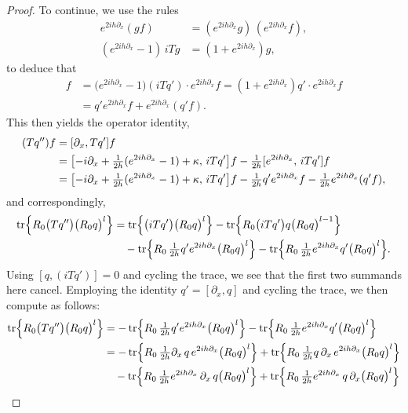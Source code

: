 \documentclass{amsart}
\DeclareMathOperator{\tr}{tr}
\theoremstyle{definition}
\theoremstyle{remark}
\begin{document}
\begin{proof}
To continue, we use the rules
\begin{align}\label{chain rule}
e^{2ih\partial_x}(gf) &= (e^{2ih\partial_x}g)\,(e^{2ih\partial_x}f), \\
(e^{2ih\partial_x} - 1) \,iT g &= (1+e^{2ih\partial_x})g,
\end{align}
to deduce that 
\begin{align*}
 [ e^{2ih\partial_x} , \,iTq']f &= \bigl(e^{2ih\partial_x}-1\bigr) (iTq') \cdot e^{2ih\partial_x} f
 	= (1+e^{2ih\partial_x})q' \cdot e^{2ih\partial_x} f \\
&= q' e^{2ih\partial_x} f + e^{2ih\partial_x}(q'f).
\end{align*}
This then yields the operator identity,
\begin{align}\label{444}
(Tq'') f &= [\partial_x, Tq'] f\\
&= \bigl[-i\partial_x + \tfrac1{2h}(e^{2ih\partial_x}-1) +\kappa, \,iTq'\bigr]f - \tfrac1{2h}[ e^{2ih\partial_x} , \,iTq']f \notag\\
&= \bigl[-i\partial_x + \tfrac1{2h}(e^{2ih\partial_x}-1) +\kappa,\, iTq'\bigr] f - \tfrac1{2h}q' e^{2ih\partial_x} f - \tfrac1{2h}e^{2ih\partial_x}(q'f),\notag
\end{align}
and correspondingly,
\begin{align*}
\tr\Bigl\{ R_0  \bigl(Tq''\bigr)\bigl(R_0 q\bigr)^{l}\Bigr\}
&= \tr\Bigl\{ \bigl(iTq'\bigr)\bigl(R_0 q\bigr)^{l}\Bigr\} -\tr\Bigl\{ R_0\bigl(iTq'\bigr)q\bigl(R_0 q\bigr)^{l-1}\Bigr\}\\
&\quad - \tr\Bigl\{ R_0\, \tfrac1{2h}q'e^{2ih\partial_x} \bigl(R_0 q\bigr)^{l}\Bigr\} -\tr\Bigl\{ R_0\, \tfrac1{2h}e^{2ih\partial_x} q' \bigl(R_0 q\bigr)^{l}\Bigr\}.
\end{align*}
Using $[q,  (iTq')]=0$ and cycling the trace, we see that the first two summands here cancel.  Employing the identity $q'=[\partial_x,q]$ and cycling the trace, we then compute as follows:
\begin{align*}
\tr\Bigl\{ R_0  \bigl(Tq''\bigr)\bigl(R_0 q\bigr)^{l}\Bigr\}
&= - \tr\Bigl\{ R_0\, \tfrac1{2h}q'e^{2ih\partial_x} \bigl(R_0 q\bigr)^{l}\Bigr\} -\tr\Bigl\{ R_0\, \tfrac1{2h}e^{2ih\partial_x} q' \bigl(R_0 q\bigr)^{l}\Bigr\}\\
&= - \tr\Bigl\{ R_0\, \tfrac1{2h}\partial_x \,q \,e^{2ih\partial_x} \bigl(R_0 q\bigr)^{l}\Bigr\} + \tr\Bigl\{ R_0\, \tfrac1{2h}q\,\partial_x \,e^{2ih\partial_x} \bigl(R_0 q\bigr)^{l}\Bigr\}\\
&\quad - \tr\Bigl\{ R_0\, \tfrac1{2h}e^{2ih\partial_x} \,\partial_x \,q \bigl(R_0 q\bigr)^{l}\Bigr\} +\tr\Bigl\{ R_0\, \tfrac1{2h}e^{2ih\partial_x}  \,q \,\partial_x\bigl(R_0 q\bigr)^{l}\Bigr\}\\

\end{align*}
\end{proof}
\end{document}
